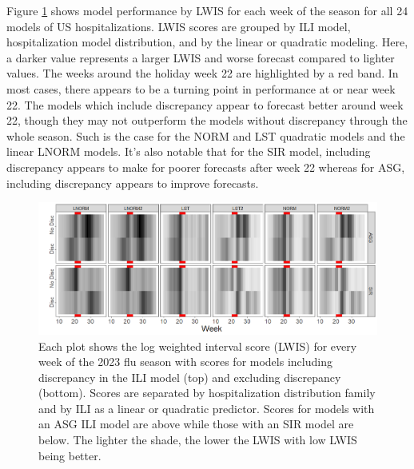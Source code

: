 \documentclass[ba]{imsart}
\theoremstyle{plain}
\theoremstyle{definition}
\theoremstyle{remark}
\begin{document}
Figure \ref{fig:us_lwis} shows model performance by LWIS for each week of the season for all 24 models of US hospitalizations. LWIS scores are grouped by ILI model, hospitalization model distribution, and by the linear or quadratic modeling. Here, a darker value represents a larger LWIS and worse forecast compared to lighter values. The weeks around the holiday week 22 are highlighted by a red band. In most cases, there appears to be a turning point in performance at or near week 22. The models which include discrepancy appear to forecast better around week 22, though they may not outperform the models without discrepancy through the whole season. 
Such is the case for the NORM and LST quadratic models and the linear LNORM models. It's also notable that for the SIR model, including discrepancy appears to make for poorer forecasts after week 22 whereas for ASG, including discrepancy appears to improve forecasts.



\begin{figure}
    
    \includegraphics[scale = .5]{../Images/lwis_us_full_season.png}
    \caption{Each plot shows the log weighted interval score (LWIS) for every week of the 2023 flu season with scores for models including discrepancy in the ILI model (top) and excluding discrepancy (bottom). Scores are separated by hospitalization distribution family and by ILI as a linear or quadratic predictor. Scores for models with an ASG ILI model are above while those with an SIR model are below. The lighter the shade, the lower the LWIS with low LWIS being better.}
    \label{fig:us_lwis}
\end{figure}

 
\end{document}
